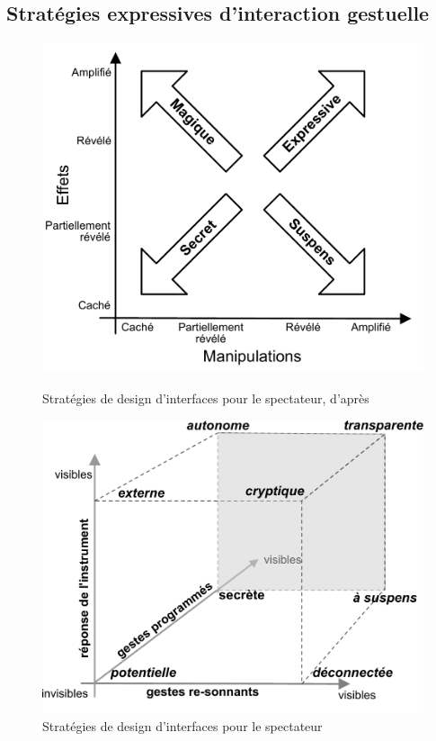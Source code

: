 \subsection{Stratégies expressives d'interaction gestuelle}
\begin{figure}[!htbp]
	\captionsetup{format=plain}%
	\centering
	\begin{minipage}[t]{0.48\textwidth}
		\includegraphics[width=\linewidth]{gfx/03_gesture/ManipulationVsEffect2.pdf}
		\caption[Stratégies de design d'interfaces pour le spectateur (schéma de Benford)]{Stratégies de design d'interfaces pour le spectateur, d'après \cite{reeves_designing_2005, benford_performing_2010}}
		\label{fig:gesture:Benford}
	\end{minipage}
	\hspace{.02\linewidth}
	\begin{minipage}[t]{0.48\textwidth}
		\includegraphics[width=\linewidth]{gfx/03_gesture/SubversiveCube.pdf}
		\caption[Stratégies de design d'interfaces pour le spectateur (schéma proposé)]{Stratégies de design d'interfaces pour le spectateur}
		\label{fig:gesture:expressive-spaceold}
	\end{minipage}
\end{figure}
